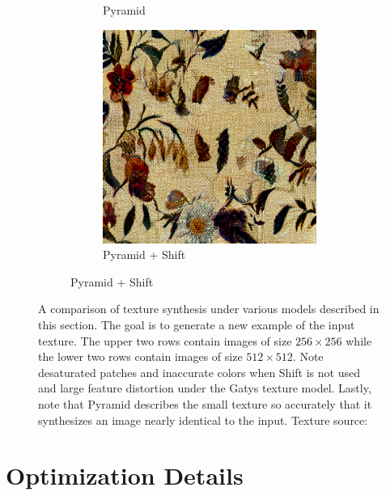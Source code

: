 \begin{figure}[ht]
\begin{subfigure}{0.8\textwidth}
\begin{subfigure}{0.32\textwidth}
            \caption{Pyramid}
            \label{fig:methods_comparison_large-pyramid}
        \end{subfigure}
        \hfill
        \begin{subfigure}{0.32\textwidth}
            \centering
            \includegraphics[width=\textwidth]{images/03-comparison_large_pyramid_shift.jpg}
            \caption{Pyramid + Shift}
            \label{fig:methods_comparison_large-pyramid_shift}
        \end{subfigure}
    \end{subfigure}
    \caption{A comparison of texture synthesis under various models described in this section. The goal is to generate a new example of the input texture. The upper two rows contain images of size \(256 \times 256\) while the lower two rows contain images of size \(512 \times 512\). Note desaturated patches and inaccurate colors when Shift is not used and large feature distortion under the Gatys texture model. Lastly, note that Pyramid describes the small texture so accurately that it synthesizes an image nearly identical to the input. Texture source: \citet{Pixar128}}
    \label{fig:methods_comparison_small}
\end{figure}

\section{Optimization Details}
\label{section:methods-optimization}

